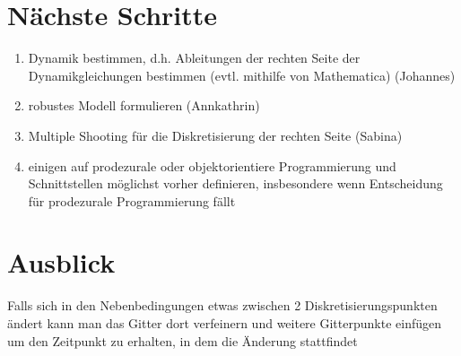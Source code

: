 \documentclass[12pt,a4paper]{article}
\theoremstyle{definition}
\theoremstyle{plain}
\begin{document}
\section{Nächste Schritte}
\begin{enumerate}
\item Dynamik bestimmen, d.h. Ableitungen der rechten Seite der Dynamikgleichungen bestimmen (evtl. mithilfe von Mathematica) (Johannes)
\item robustes Modell formulieren (Annkathrin)
\item Multiple Shooting für die Diskretisierung der rechten Seite (Sabina)
\item einigen auf prodezurale oder objektorientiere Programmierung und Schnittstellen möglichst vorher definieren, insbesondere wenn Entscheidung für prodezurale Programmierung fällt 
\end{enumerate}

\section{Ausblick}
Falls sich in den Nebenbedingungen etwas zwischen 2 Diskretisierungspunkten ändert kann man das Gitter dort verfeinern und weitere Gitterpunkte einfügen um den Zeitpunkt zu erhalten, in dem die Änderung stattfindet
\end{document}
